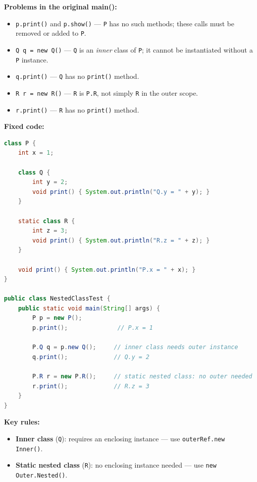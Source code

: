 \documentclass[12pt,a3paper]{article}
\begin{document}
\begin{enumerate}
\begin{tcolorbox}[enhanced,breakable,ansbox,
  colback=cC!4,colframe=cC,boxrule=0.8pt,arc=5pt,
  title={\textbf{Answer --- Fixing Nested Class main() Problems}},
  fonttitle=\bfseries\color{white},colbacktitle=cC]
\textbf{Problems in the original main():}
\begin{itemize}[itemsep=2pt]
  \item \texttt{p.print()} and \texttt{p.show()} --- \texttt{P} has no
  such methods; these calls must be removed or added to \texttt{P}.
  \item \texttt{Q q = new Q()} --- \texttt{Q} is an \emph{inner} class
  of \texttt{P}; it cannot be instantiated without a \texttt{P}
  instance.
  \item \texttt{q.print()} --- \texttt{Q} has no \texttt{print()} method.
  \item \texttt{R r = new R()} --- \texttt{R} is \texttt{P.R}, not
  simply \texttt{R} in the outer scope.
  \item \texttt{r.print()} --- \texttt{R} has no \texttt{print()} method.
\end{itemize}

\textbf{Fixed code:}
\begin{lstlisting}[language=Java]
class P {
    int x = 1;

    class Q {
        int y = 2;
        void print() { System.out.println("Q.y = " + y); }
    }

    static class R {
        int z = 3;
        void print() { System.out.println("R.z = " + z); }
    }

    void print() { System.out.println("P.x = " + x); }
}

public class NestedClassTest {
    public static void main(String[] args) {
        P p = new P();
        p.print();              // P.x = 1

        P.Q q = p.new Q();     // inner class needs outer instance
        q.print();             // Q.y = 2

        P.R r = new P.R();     // static nested class: no outer needed
        r.print();             // R.z = 3
    }
}
\end{lstlisting}
\textbf{Key rules:}
\begin{itemize}[itemsep=2pt]
  \item \textbf{Inner class} (\texttt{Q}): requires an enclosing
  instance --- use \texttt{outerRef.new Inner()}.
  \item \textbf{Static nested class} (\texttt{R}): no enclosing
  instance needed --- use \texttt{new Outer.Nested()}.
\end{itemize}
\end{tcolorbox}


\end{enumerate}
\end{document}
